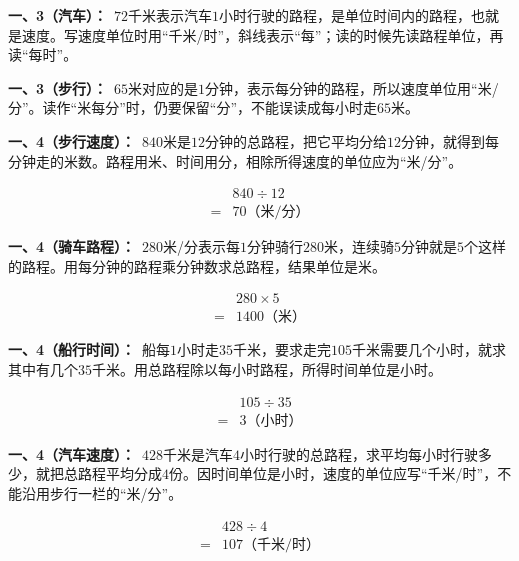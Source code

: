 \documentclass[multi=snippet,border=0pt]{standalone}
\newenvironment{snippet}[3]{\begin{minipage}{#1bp}\color{answerred}\fontsize{#2}{#3}\selectfont\raggedright}{\end{minipage}}
\begin{document}
\begin{snippet}{505}{11.5}{14}\textbf{一、3（汽车）：}\ \(72\)千米表示汽车\(1\)小时行驶的路程，是单位时间内的路程，也就是速度。写速度单位时用“千米/时”，斜线表示“每”；读的时候先读路程单位，再读“每时”。\end{snippet}
\begin{snippet}{505}{11.5}{14}\textbf{一、3（步行）：}\ \(65\)米对应的是\(1\)分钟，表示每分钟的路程，所以速度单位用“米/分”。读作“米每分”时，仍要保留“分”，不能误读成每小时走\(65\)米。\end{snippet}
\begin{snippet}{505}{11.5}{14}\textbf{一、4（步行速度）：}\ \(840\)米是\(12\)分钟的总路程，把它平均分给\(12\)分钟，就得到每分钟走的米数。路程用米、时间用分，相除所得速度的单位应为“米/分”。\par \[\begin{aligned}&840\div12\\={}&70\text{（米/分）}\end{aligned}\]\end{snippet}
\begin{snippet}{505}{11.5}{14}\textbf{一、4（骑车路程）：}\ \(280\)米/分表示每\(1\)分钟骑行\(280\)米，连续骑\(5\)分钟就是\(5\)个这样的路程。用每分钟的路程乘分钟数求总路程，结果单位是米。\par \[\begin{aligned}&280\times5\\={}&1400\text{（米）}\end{aligned}\]\end{snippet}
\begin{snippet}{505}{11.5}{14}\textbf{一、4（船行时间）：}\ 船每\(1\)小时走\(35\)千米，要求走完\(105\)千米需要几个小时，就求其中有几个\(35\)千米。用总路程除以每小时路程，所得时间单位是小时。\par \[\begin{aligned}&105\div35\\={}&3\text{（小时）}\end{aligned}\]\end{snippet}
\begin{snippet}{505}{11.5}{14}\textbf{一、4（汽车速度）：}\ \(428\)千米是汽车\(4\)小时行驶的总路程，求平均每小时行驶多少，就把总路程平均分成\(4\)份。因时间单位是小时，速度的单位应写“千米/时”，不能沿用步行一栏的“米/分”。\par \[\begin{aligned}&428\div4\\={}&107\text{（千米/时）}\end{aligned}\]\end{snippet}
\end{document}
